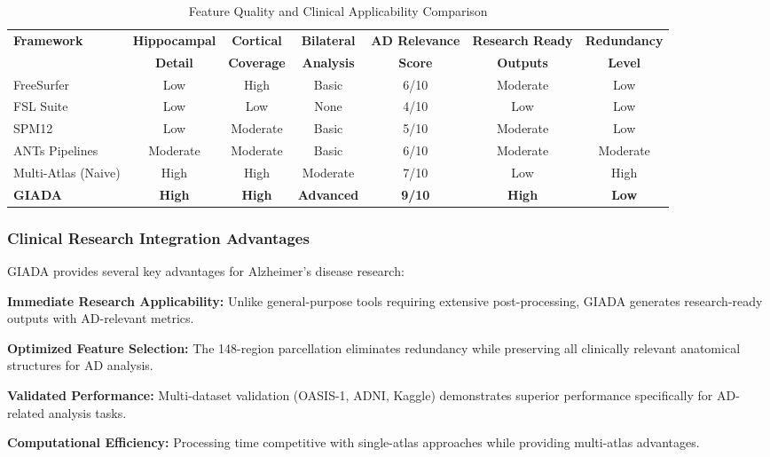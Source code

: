\documentclass[a4paper,11pt]{article}
\begin{document}
\begin{table}[ht]
\centering
\caption{Feature Quality and Clinical Applicability Comparison}
\label{tab:detailed_comparison}
\begin{tabular}{@{}lcccccc@{}}
\toprule
\textbf{Framework} & \textbf{Hippocampal} & \textbf{Cortical} & \textbf{Bilateral} & \textbf{AD Relevance} & \textbf{Research Ready} & \textbf{Redundancy} \\
 & \textbf{Detail} & \textbf{Coverage} & \textbf{Analysis} & \textbf{Score} & \textbf{Outputs} & \textbf{Level} \\
\midrule
FreeSurfer & Low & High & Basic & 6/10 & Moderate & Low \\
FSL Suite & Low & Low & None & 4/10 & Low & Low \\
SPM12 & Low & Moderate & Basic & 5/10 & Moderate & Low \\
ANTs Pipelines & Moderate & Moderate & Basic & 6/10 & Moderate & Moderate \\
Multi-Atlas (Naive) & High & High & Moderate & 7/10 & Low & High \\
\textbf{GIADA} & \textbf{High} & \textbf{High} & \textbf{Advanced} & \textbf{9/10} & \textbf{High} & \textbf{Low} \\
\bottomrule
\end{tabular}
\end{table}

\subsubsection{Clinical Research Integration Advantages}

GIADA provides several key advantages for Alzheimer's disease research:

\textbf{Immediate Research Applicability:} Unlike general-purpose tools requiring extensive post-processing, GIADA generates research-ready outputs with AD-relevant metrics.

\textbf{Optimized Feature Selection:} The 148-region parcellation eliminates redundancy while preserving all clinically relevant anatomical structures for AD analysis.

\textbf{Validated Performance:} Multi-dataset validation (OASIS-1, ADNI, Kaggle) demonstrates superior performance specifically for AD-related analysis tasks.

\textbf{Computational Efficiency:} Processing time competitive with single-atlas approaches while providing multi-atlas advantages.
\end{document}

